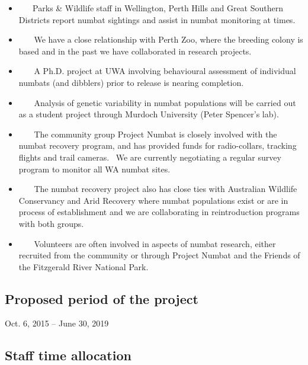 \documentclass[version=last,
    paper=a4, %
    10pt, %
    usenames,
    dvipsnames,
    oneside, %
    headings=openany, %
    DIV=15 %
]{scrbook}
\begin{document}
\begin{itemize}
\itemsep1pt\parskip0pt
\item
  ~ ~ Parks \& Wildlife staff in Wellington, Perth Hills and Great
  Southern Districts report numbat sightings and assist in numbat
  monitoring at times. ~
\item
  ~~~ We have a close relationship with Perth Zoo, where the breeding
  colony is based and in the past we have collaborated in research
  projects. ~
\item
  ~~~ A Ph.D. project at UWA involving behavioural assessment of
  individual numbats (and dibblers) prior to release is nearing
  completion.~
\item
  ~~~ Analysis of genetic variability in numbat populations will be
  carried out as a student project through Murdoch University (Peter
  Spencer's lab).~
\item
  ~~~ The community group Project Numbat is closely involved with the
  numbat recovery program, and has provided funds for radio-collars,
  tracking flights and trail cameras.~ We are currently negotiating a
  regular survey program to monitor all WA numbat sites.~
\item
  ~~~ The numbat recovery project also has close ties with Australian
  Wildlife Conservancy and Arid Recovery where numbat populations exist
  or are in process of establishment and we are collaborating in
  reintroduction programs with both groups.~
\item
  ~~~ Volunteers are often involved in aspects of numbat research,
  either recruited from the community or through Project Numbat and the
  Friends of the Fitzgerald River National Park.~~
\end{itemize}


\subsection*{Proposed period of the project}
Oct. 6, 2015 -- June 30, 2019



\subsection*{Staff time allocation }
\end{document}
